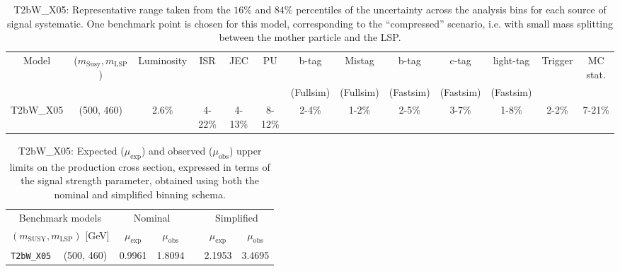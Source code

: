 \begin{landscape}
\begin{table}[htbp]
    \centering
    \small
    \begin{tabular}{ ccccccccccccc }
        \hline \hline
        Model & ($m_{\mathrm{Susy}},m_{\mathrm{LSP}}$) & Luminosity & ISR & JEC & PU & b-tag & Mistag & b-tag & c-tag & light-tag & Trigger & MC stat. \\
        & & & & & & (Fullsim) & (Fullsim) & (Fastsim) & (Fastsim) & (Fastsim) & & \\ \hline
        T2bW\_X05 & (500, 460) & 2.6\% & 4-22\% & 4-13\% & 8-12\% & 2-4\% & 1-2\% & 2-5\% & 3-7\% & 1-8\% & 2-2\% & 7-21\% \\
        \hline \hline
        \end{tabular}
    \caption{T2bW\_X05: Representative range taken from the $16\%$ and $84\%$ percentiles of the uncertainty across the analysis bins for each source of signal systematic. One benchmark point is chosen for this model, corresponding to the ``compressed'' scenario, i.e. with small mass splitting between the mother particle and the LSP.}
    \label{tab:T2bWSUS16038systs}
\end{table}
\end{landscape}

\begin{table}[htbp]
  \centering
  \begin{tabular}{ llccccc }
    \hline
    \multicolumn{2}{c}{Benchmark models}    & \multicolumn{2}{c}{Nominal}
                                            &
                                            & \multicolumn{2}{c}{Simplified}             \\ [0.3ex]
    \cline{3-4}
    \cline{6-7}
    \multicolumn{2}{c}{$(m_{\text{SUSY}}, m_{\mathrm{LSP}})$ [GeV]}
                                            & $\mu_{\text{exp}}$
                                            & $\mu_{\text{obs}}$
                                            &
                                            & $\mu_{\text{exp}}$
                                            & $\mu_{\text{obs}}$                         \\ [0.3ex]
    \hline
    \texttt{T2bW\_X05} & (500, 460) & 0.9961 & 1.8094 & & 2.1953 & 3.4695 \\
        \hline
  \end{tabular}
  \caption{T2bW\_X05: Expected ($\mu_{\mathrm{exp}}$) and observed ($\mu_{\mathrm{obs}}$) upper limits on the production cross section, expressed in terms of the signal strength parameter, obtained using both the nominal and simplified binning schema.}
\end{table}

